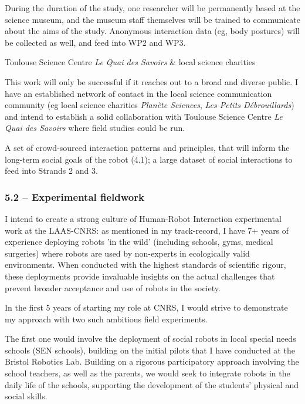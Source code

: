 During the duration of the study, one researcher will be permanently based at
the science museum, and the museum staff themselves will be trained to
communicate about the aims of the study. Anonymous interaction data (eg, body
postures) will be collected as well, and feed into WP2 and WP3.

\begin{collaboration}{Toulouse Science Centre \emph{Le Quai des Savoirs}
    \newline \& local science charities}

    This work will only be successful if it reaches out to a broad and diverse
    public. I have an established network of contact in the local science
    communication community (eg local science charities \emph{Planète Sciences},
    \emph{Les Petits Débrouillards}) and intend to establish a solid
    collaboration with Toulouse Science Centre \emph{Le Quai des Savoirs} where
    field studies could be run.
    
\end{collaboration}

\begin{outcome}{5.1}
A set of crowd-sourced interaction
    patterns and principles, that will inform the long-term social goals of the
    robot (4.1); a large dataset of social interactions to feed into Strands 2
    and 3.
\end{outcome}

\subsubsection{5.2 -- Experimental fieldwork}

I intend to create a strong culture of Human-Robot Interaction experimental work
at the LAAS-CNRS: as mentioned in my track-record, I have 7+ years of experience
deploying robots 'in the wild' (including schools, gyms, medical surgeries)
where robots are used by non-experts in ecologically valid environments. When
conducted with the highest standards of scientific rigour, these
deployments provide invaluable insights on the actual challenges that prevent
broader acceptance and use of robots in the society.

In the first 5 years of starting my role at CNRS, I would strive to demonstrate
my approach with two such ambitious field experiments.

The first one would involve the deployment of social robots in local special needs schools
(SEN schools), building on the initial pilots that I have conducted at the
Bristol Robotics Lab. Building on a rigorous participatory approach
involving the school teachers, as well as the parents, we would seek to integrate
robots in the daily life of the schools, supporting the development of the
students' physical and social skills.

